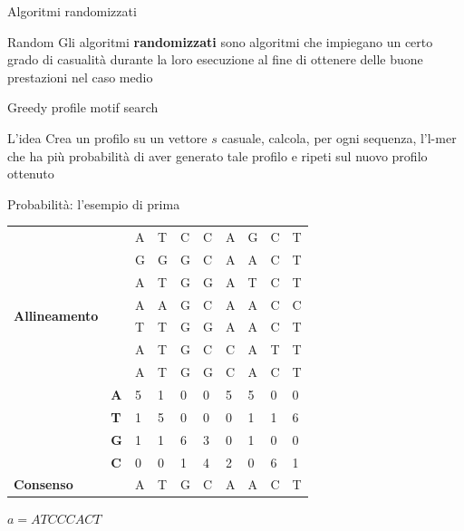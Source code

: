 	\begin{frame}{Algoritmi randomizzati}
		\begin{block}{Random}
			Gli algoritmi \alert{\textbf{randomizzati}} sono algoritmi che impiegano un certo grado di casualità durante la loro esecuzione al fine di ottenere delle buone prestazioni nel caso medio
		\end{block}
	\end{frame}
	
	\begin{frame}{Greedy profile motif search}
		\begin{block}{L'idea}
			Crea un profilo su un vettore $s$ casuale, calcola, per ogni sequenza, l'l-mer che ha più probabilità di aver generato tale profilo e ripeti sul nuovo profilo ottenuto
		\end{block}
	\end{frame}
	
	\begin{frame}{Probabilità: l'esempio di prima}
		\begin{center}
			\begin{tabular}{l l l l l l l l l l}
				\multirow{8}{*}{\textbf{Allineamento}} & & A & T & C & C & A & G & C & T\\
				& & G & G & G & C & A & A & C & T\\
				& & A & T & G & G & A & T & C & T\\
				& & A & A & G & C & A & A & C & C\\
				& & T & T & G & G & A & A & C & T\\
				& & A & T & G & C & C & A & T & T\\
				& & A & T & G & G & C & A & C & T\\
				\hline
				\multirow{4}{*}{\textbf{Profilo}} & \textbf{A} & 5 & 1 & 0 & 0 & 5 & 5 & 0 & 0\\
				& \textbf{T} & 1 & 5 & 0 & 0 & 0 & 1 & 1 & 6\\
				& \textbf{G} & 1 & 1 & 6 & 3 & 0 & 1 & 0 & 0\\
				& \textbf{C} & 0 & 0 & 1 & 4 & 2 & 0 & 6 & 1\\
				\hline
				\textbf{Consenso} & & A & T & G & C & A & A & C & T 
			\end{tabular}
		\end{center}
		$a = ATCCCACT$\\
		\only<2->{$Prob(a|P) = 5\cdot 5\cdot 1\cdot 4\cdot 2\cdot 5\cdot 6\cdot 6=36000$}
	\end{frame}
	
